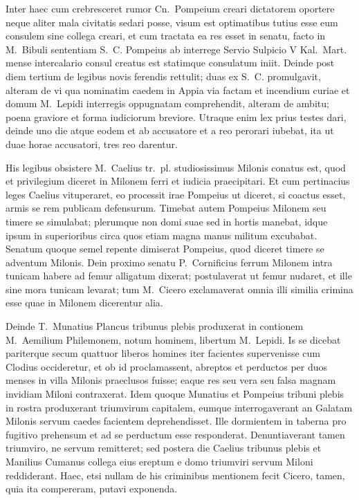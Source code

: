 Inter haec cum crebresceret rumor Cn.~Pompeium creari dictatorem oportere neque aliter mala civitatis sedari posse, visum est optimatibus tutius esse eum consulem sine collega creari, et cum tractata ea res esset in senatu, facto in M.~Bibuli sententiam S.~C. Pompeius ab interrege Servio Sulpicio V Kal.~Mart. mense intercalario consul creatus est statimque consulatum iniit. Deinde post diem tertium de legibus novis ferendis rettulit; duas ex S.~C. promulgavit, alteram de vi qua nominatim caedem in Appia via factam et incendium curiae et domum M.~Lepidi interregis oppugnatam comprehendit, alteram de ambitu; poena graviore et forma iudiciorum breviore. Utraque enim lex prius testes dari, deinde uno die atque eodem et ab accusatore et a reo perorari iubebat, ita ut duae horae accusatori, tres reo darentur. 

His legibus obsistere M.~Caelius tr.~pl. studiosissimus Milonis conatus est, quod et privilegium diceret in Milonem ferri et iudicia praecipitari. Et cum pertinacius leges Caelius vituperaret, eo processit irae Pompeius ut diceret, si coactus esset, armis se rem publicam defensurum. Timebat autem Pompeius Milonem seu timere se simulabat; plerumque non domi suae sed in hortis manebat, idque ipsum in superioribus circa quos etiam magna manus militum excubabat. Senatum quoque semel repente dimiserat Pompeius, quod diceret timere se adventum Milonis. Dein proximo senatu P.~Cornificius ferrum Milonem intra tunicam habere ad femur alligatum dixerat; postulaverat ut femur nudaret, et ille sine mora tunicam levarat; tum M.~Cicero exclamaverat omnia illi similia crimina esse quae in Milonem dicerentur alia.

Deinde T.~Munatius Plancus tribunus plebis produxerat in contionem M.~Aemilium Philemonem, notum hominem, libertum M.~Lepidi. Is se dicebat pariterque secum quattuor liberos homines iter facientes supervenisse cum Clodius occideretur, et ob id proclamassent, abreptos et perductos per duos menses in villa Milonis praeclusos fuisse; eaque res seu vera seu falsa magnam invidiam Miloni contraxerat. Idem quoque Munatius et Pompeius tribuni plebis in rostra produxerant triumvirum capitalem, eumque interrogaverant an Galatam Milonis servum caedes facientem deprehendisset. Ille dormientem in taberna pro fugitivo prehensum et ad se perductum esse responderat. Denuntiaverant tamen triumviro, ne servum remitteret; sed postera die Caelius tribunus plebis et Manilius Cumanus collega eius ereptum e domo triumviri servum Miloni reddiderant. Haec, etsi nullam de his criminibus mentionem fecit Cicero, tamen, quia ita compereram, putavi exponenda. 

